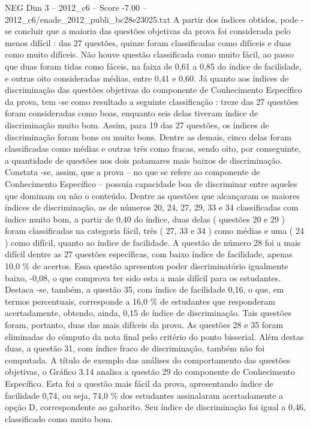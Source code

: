 \begin{textsample}{NEG Dim 3 – 2012\_c6 – Score -7.00 – 2012\_c6/enade\_2012\_publi\_bc28e23025.txt}
A partir dos índices obtidos, pode -se concluir que a maioria das questões objetivas da prova foi considerada pelo menos difícil : das 27 questões, quinze foram classificadas como difíceis e duas como muito difíceis.
Não houve questão classificada como muito fácil, ao passo que duas foram tidas como fáceis, na faixa de 0,61 a 0,85 do índice de facilidade, e outras oito consideradas médias, entre 0,41 e 0,60.
Já quanto aos índices de discriminação das questões objetivas do componente de Conhecimento Específico da prova, tem -se como resultado a seguinte classificação : treze das 27 questões foram consideradas como boas, enquanto seis delas tiveram índice de discriminação muito bom.
Assim, para 19 das 27 questões, os índices de discriminação foram bons ou muito bons.
Dentre as demais, cinco delas foram classificadas como médias e outras três como fracas, sendo oito, por conseguinte, a quantidade de questões nos dois patamares mais baixos de discriminação.
Constata -se, assim, que a prova – no que se refere ao componente de Conhecimento Específico – possuía capacidade boa de discriminar entre aqueles que dominam ou não o conteúdo.
Dentre as questões que alcançaram os maiores índices de discriminação, as de números 20, 24, 27, 29, 33 e 34 classificadas com índice muito bom, a partir de 0,40 do índice, duas delas ( questões 20 e 29 ) foram classificadas na categoria fácil, três ( 27, 33 e 34 ) como médias e uma ( 24 ) como difícil, quanto ao índice de facilidade.
A questão de número 28 foi a mais difícil dentre as 27 questões específicas, com baixo índice de facilidade, apenas 10,0 \% de acertos.
Essa questão apresentou poder discriminatório igualmente baixo, -0,08, o que comprova ter sido esta a mais difícil para os estudantes.
Destaca -se, também, a questão 35, com índice de facilidade 0,16, o que, em termos percentuais, corresponde a 16,0 \% de estudantes que responderam acertadamente, obtendo, ainda, 0,15 de índice de discriminação.
Tais questões foram, portanto, duas das mais difíceis da prova.
As questões 28 e 35 foram eliminadas do cômputo da nota final pelo critério do ponto bisserial.
Além destas duas, a questão 31, com índice fraco de discriminação, também não foi computada.
A título de exemplo das análises do comportamento das questões objetivas, o Gráfico 3.14 analisa a questão 29 do componente de Conhecimento Específico.
Esta foi a questão mais fácil da prova, apresentando índice de facilidade 0,74, ou seja, 74,0 \% dos estudantes assinalaram acertadamente a opção D, correspondente ao gabarito.
Seu índice de discriminação foi igual a 0,46, classificado como muito bom.

\end{textsample}
